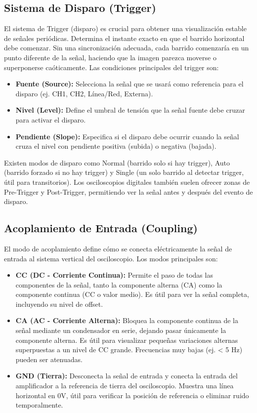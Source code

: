 \subsection{Sistema de Disparo (Trigger)}
El sistema de Trigger (disparo) es crucial para obtener una visualización estable de señales periódicas. Determina el instante exacto en que el barrido horizontal debe comenzar. Sin una sincronización adecuada, cada barrido comenzaría en un punto diferente de la señal, haciendo que la imagen parezca moverse o superponerse caóticamente. Las condiciones principales del trigger son:
\begin{itemize}
    \item \textbf{Fuente (Source):} Selecciona la señal que se usará como referencia para el disparo (ej. CH1, CH2, Línea/Red, Externa).
    \item \textbf{Nivel (Level):} Define el umbral de tensión que la señal fuente debe cruzar para activar el disparo.
    \item \textbf{Pendiente (Slope):} Especifica si el disparo debe ocurrir cuando la señal cruza el nivel con pendiente positiva (subida) o negativa (bajada).
\end{itemize}
Existen modos de disparo como Normal (barrido solo si hay trigger), Auto (barrido forzado si no hay trigger) y Single (un solo barrido al detectar trigger, útil para transitorios). Los osciloscopios digitales también suelen ofrecer zonas de Pre-Trigger y Post-Trigger, permitiendo ver la señal antes y después del evento de disparo.

\subsection{Acoplamiento de Entrada (Coupling)}
El modo de acoplamiento define cómo se conecta eléctricamente la señal de entrada al sistema vertical del osciloscopio. Los modos principales son:
\begin{itemize}
    \item \textbf{CC (DC - Corriente Continua):} Permite el paso de todas las componentes de la señal, tanto la componente alterna (CA) como la componente continua (CC o valor medio). Es útil para ver la señal completa, incluyendo su nivel de offset.
    \item \textbf{CA (AC - Corriente Alterna):} Bloquea la componente continua de la señal mediante un condensador en serie, dejando pasar únicamente la componente alterna. Es útil para visualizar pequeñas variaciones alternas superpuestas a un nivel de CC grande. Frecuencias muy bajas (ej. < 5 Hz) pueden ser atenuadas.
    \item \textbf{GND (Tierra):} Desconecta la señal de entrada y conecta la entrada del amplificador a la referencia de tierra del osciloscopio. Muestra una línea horizontal en 0V, útil para verificar la posición de referencia o eliminar ruido temporalmente.
\end{itemize}

